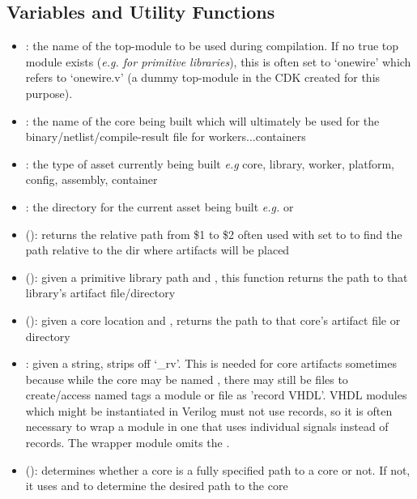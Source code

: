 \subsection{Variables and Utility Functions}
\begin{itemize}
\item {}: the name of the top-module to be used during compilation. If no true top module exists (\textit{e.g. for primitive libraries}), this is often set to `onewire' which refers to `onewire.v' (a dummy top-module in the CDK created for this purpose).
\item {}: the name of the core being built which will ultimately be used for the binary/netlist/compile-result file for workers...containers
\item {}: the type of asset currently being built
	\subitem \textit{e.g} core, library, worker, platform, config, assembly, container
\item {}: the  directory for the current asset being built
	\subitem \textit{e.g.}  or 
\item {} (): returns the relative path from \$1 to \$2
	\subitem often used with  set to  to find the path relative to the dir where artifacts will be placed
\item {} (): given a primitive library path and , this function returns the path to that library's artifact file/directory
\item {} (): given a core location and , returns the path to that core's artifact file or directory
\item {}: given a string, strips off `\_rv'. This is needed for core artifacts sometimes because while the core may be named , there may still be files to create/access named 
	\subitem {} tags a module or file as 'record VHDL'. VHDL modules which might be instantiated in Verilog must not use records, so it is often necessary to wrap a  module in one that uses individual signals instead of records. The wrapper module omits the .
\item {} (): determines whether a core is a fully specified path to a core or not. If not, it uses  and  to determine the desired path to the core

\end{itemize}
